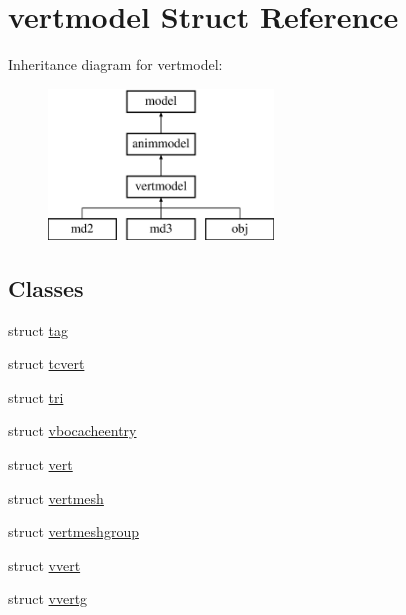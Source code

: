 \hypertarget{structvertmodel}{}\section{vertmodel Struct Reference}
\label{structvertmodel}
Inheritance diagram for vertmodel\+:\begin{figure}[H]
\begin{center}
\leavevmode
\includegraphics[height=4.000000cm]{structvertmodel}
\end{center}
\end{figure}
\subsection*{Classes}
\begin{DoxyCompactItemize}
\item 
struct \hyperlink{structvertmodel_1_1tag}{tag}
\item 
struct \hyperlink{structvertmodel_1_1tcvert}{tcvert}
\item 
struct \hyperlink{structvertmodel_1_1tri}{tri}
\item 
struct \hyperlink{structvertmodel_1_1vbocacheentry}{vbocacheentry}
\item 
struct \hyperlink{structvertmodel_1_1vert}{vert}
\item 
struct \hyperlink{structvertmodel_1_1vertmesh}{vertmesh}
\item 
struct \hyperlink{structvertmodel_1_1vertmeshgroup}{vertmeshgroup}
\item 
struct \hyperlink{structvertmodel_1_1vvert}{vvert}
\item 
struct \hyperlink{structvertmodel_1_1vvertg}{vvertg}
\end{DoxyCompactItemize}
